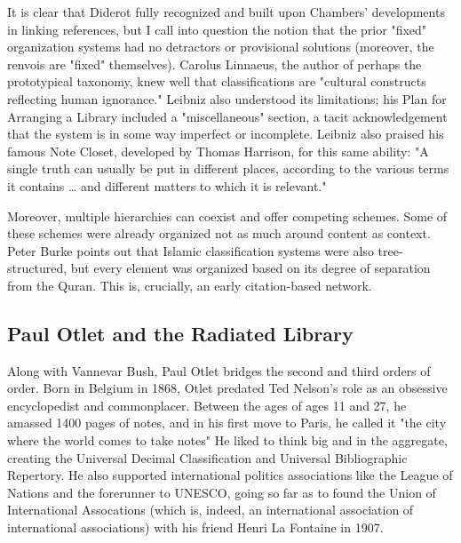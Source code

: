 It is clear that Diderot fully recognized and built upon Chambers' developments in linking references, but I call into question the notion that the prior "fixed" organization systems had no detractors or provisional solutions (moreover, the renvois are "fixed" themselves). Carolus Linnaeus, the author of perhaps the prototypical taxonomy, knew well that classifications are "cultural constructs reflecting human ignorance."  Leibniz also understood its limitations; his Plan for Arranging a Library included a "miscellaneous" section, a tacit acknowledgement that the system is in some way imperfect or incomplete. Leibniz also praised his famous Note Closet, developed by Thomas Harrison, for this same ability: "A single truth can usually be put in different places, according to the various terms it contains … and different matters to which it is relevant." 

Moreover, multiple hierarchies can coexist and offer competing schemes. Some of these schemes were already organized not as much around content as context. Peter Burke points out that Islamic classification systems were also tree-structured, but every element was organized based on its degree of separation from the Quran.  This is, crucially, an early citation-based network.

\subsection{Paul Otlet and the Radiated Library}

Along with Vannevar Bush, Paul Otlet bridges the second and third orders of order. Born in Belgium in 1868, Otlet predated Ted Nelson's role as an obsessive encyclopedist and commonplacer. Between the ages of ages 11 and 27, he amassed 1400 pages of notes, and in his first move to Paris, he called it "the city where the world comes to take notes"  He liked to think big and in the aggregate, creating the Universal Decimal Classification and Universal Bibliographic Repertory. He also supported international politics associations like the League of Nations and the forerunner to UNESCO, going so far as to found the Union of International Assocations (which is, indeed, an international association of international associations) with his friend Henri La Fontaine in 1907.

